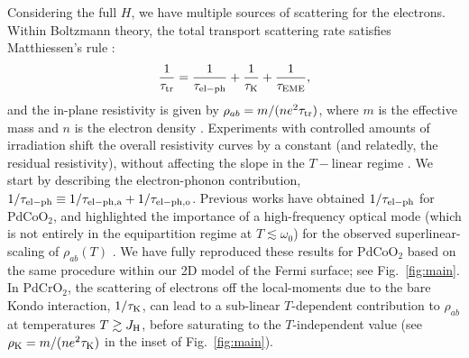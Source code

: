 \documentclass[aps,prl,twocolumn,superscriptaddress,amsmath,nofootinbib,10pt,floatfix]{revtex4-2}
\begin{document}
Considering the full $H$, we have multiple sources of scattering for the electrons. Within Boltzmann theory, the total transport scattering rate satisfies Matthiessen's rule \cite{Ziman_2001}: 
\begin{eqnarray}
\frac{1}{\tau_{\rm tr}} = \frac{1}{\tau_{\rm{el-ph}}} + \frac{1}{\tau_{\rm K}} + \frac{1}{\tau_{\rm EME}},
\label{tr_time}
\end{eqnarray}
and the in-plane resistivity is given by $\rho_{ab} = m/(ne^2 \tau_{\rm tr})$, where $m$ is the effective mass and $n$ is the electron density \cite{Supplementary_material}. Experiments with controlled amounts of irradiation shift the overall resistivity curves by a constant (and relatedly, the residual resistivity), without affecting the slope in the $T-$linear regime \cite{Zhakina2023}.  We start by describing the electron-phonon contribution, $1/\tau_{\rm{el-ph}}\equiv 1/\tau_{\rm{el-ph},a}+1/\tau_{\rm{el-ph},o}$.  
Previous works have obtained $1/\tau_{\rm{el-ph}}$ for PdCoO$_2$, and highlighted the importance of a high-frequency optical mode (which is not entirely in the equipartition regime at $T\lesssim \omega_0$) for the observed superlinear-scaling of $\rho_{ab}(T)$ \cite{takatsu_roles_2007,Hicks_mobility_2012}. We have fully reproduced these results for PdCoO$_2$ based on the same procedure \cite{Supplementary_material} within our 2D  model of the Fermi surface; see Fig.~\ref{fig:main}. In PdCrO$_2$, the scattering of electrons off the local-moments due to the bare Kondo interaction, $1/\tau_{\rm K}$, can lead to a sub-linear $T$-dependent contribution to $\rho_{ab}$ at temperatures $T \gtrsim J_{\rm H}$, before saturating to the $T$-independent value \cite{mcroberts2022intermediatescale} (see $\rho_{\rm K}=m/(ne^2 \tau_{\rm K})$ in the inset of Fig.~\ref{fig:main}).
\end{document}
